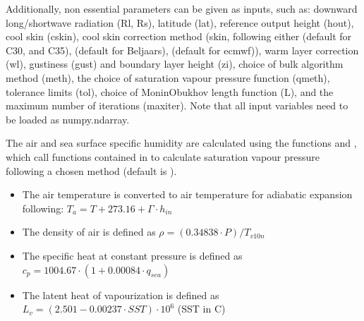 \documentclass[letterpaper,10pt,english]{sphinxmanual}
\begin{document}
\sphinxAtStartPar
Additionally, non essential parameters can be given as inputs, such as: downward long/shortwave radiation (Rl, Rs), latitude (lat), reference output height (hout),  cool skin (cskin), cool skin correction method (skin, following either   (default for C30, and C35),  (default for Beljaars),  (default for ecmwf)), warm layer correction (wl), gustiness (gust) and boundary layer height (zi), choice of bulk algorithm method (meth), the choice of saturation vapour pressure function (qmeth), tolerance limits (tol), choice of Monin\sphinxhyphen{}Obukhov length function (L), and the maximum number of iterations (maxiter). Note that all input variables need to be loaded as numpy.ndarray.

\sphinxAtStartPar
The air and sea surface specific humidity are calculated using the functions {\hyperref[\detokenize{users_guide:AirSeaFluxCode.hum_subs.qsat_air}]{}} and {\hyperref[\detokenize{users_guide:AirSeaFluxCode.hum_subs.qsat_sea}]{}}, which call functions contained in {\hyperref[\detokenize{users_guide:AirSeaFluxCode.hum_subs.VaporPressure}]{}} to calculate saturation vapour pressure following a chosen method (default is ).
\begin{itemize}
\item {}
\sphinxAtStartPar
The air temperature is converted to air temperature for adiabatic expansion following: \(T_a = T + 273.16 + \Gamma \cdot h_{in}\)

\item {}
\sphinxAtStartPar
The density of air is defined as \(\rho= (0.34838 \cdot P)/T_{v10n}\)

\item {}
\sphinxAtStartPar
The specific heat at constant pressure is defined  as \(c_p = 1004.67 \cdot (1 + 0.00084 \cdot q_{sea})\)

\item {}
\sphinxAtStartPar
The latent heat of vapourization is defined as \(L_{v} = (2.501 - 0.00237 \cdot SST) \cdot 10^{6}\) (SST in C)

\end{itemize}
\end{document}
